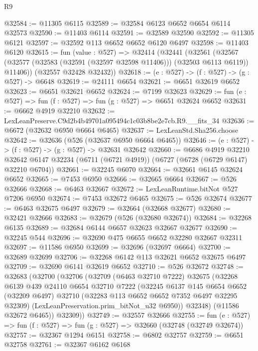 \begin{lexlean}{R9}
\begin{coremodule}
@32584 := @11305 @6115
@32589 := @32584 @6123 @6652 @6654 @6114 @32573
@32590 := @11403 @6114
@32591 := @32589 @32590
@32592 := @11305 @6121
@32597 := @32592 @113 @6652 @6652 @6120 @6497
@32598 := @11403 @6120
@32615 := fun (value : @527) =>
  @32414
    (@32441
      (@32561
        (@32567 (@32577 (@32583 (@32591 (@32597 @32598 @11406))) (@32503 @6113 @6119)) @11406))
      (@32557 @32428 @32432))
@32618 := (e : @527) -> (f : @527) -> (g : @527) -> @6648
@32619 := @24111 @6654
@32621 := @6651 @32619 @6652
@32623 := @6651 @32621 @6652
@32624 := @7199 @32623
@32629 := fun (e : @527) => fun (f : @527) => fun (g : @527) => @6651 @32624 @6652
@32631 := @6662 @4919 @32210
@32632 := LexLeanPreserve.C9d2b4b49701a095494c1c03b8be2e7cb.R9.__fits_34
@32636 := @6672 (@32632 @6950 @6664 @6465)
@32637 := LexLeanStd.Sha256.choose
@32642 := @32636 (@526 (@32637 @6950 @6664 @6465))
@32646 := (e : @527) -> (f : @527) -> (g : @527) -> @32631 @32642
@32660 := @6686
    @4919
    @32210
    @32642
    @6147
    @32234
    (@6711 (@6721 @4919))
    (@6727 (@6728 (@6729 @6147) @32210 @6704))
@32661 := @32245 @6070
@32664 := @32661 @6145 @32624 @6652
@32665 := @7453 @6950
@32666 := @32665 @6664
@32667 := @526 @32666
@32668 := @6463 @32667
@32672 := LexLeanRuntime.bitNot @527 @7206 @6950
@32674 := @7453 @32672 @6465
@32675 := @526 @32674
@32677 := @6463 @32675 @6497
@32679 := @32664 (@32668 @32677)
@32680 := @32421 @32666
@32683 := @32679 (@526 (@32680 @32674))
@32684 := @32268 @6135
@32689 := @32684 @6144 @6657 @32623 @32667 @32677
@32690 := @32245 @544
@32696 := @32690 @475 @6655 @6652 @32280 @32667 @32311
@32697 := @11586 @6950
@32699 := @32696 (@32697 @6664)
@32700 := @32689 @32699
@32706 := @32268 @6142 @113 @32621 @6652 @32675 @6497
@32709 := @32690 @6141 @32619 @6652
@32710 := @526 @32672
@32748 := @32683
    (@32700
      (@32706
        (@32709
          (@6463 @32710 @7222)
          @32675
          (@32268
            @6139
            @439
            @24110
            @6654
            @32710
            @7222
            (@32245
              @6137
              @145
              @6654
              @6652
              (@32209 @6497)
              @32710
              (@32283 @113 @6652 @6652 @7352 @6497 @32295 @32309)
              (LexLeanPreservation.prim_bitNot_u32 @6950))
            @32348)
          (@11586 @32672 @6465))
        @32309))
@32749 := @32557 @32666
@32755 := fun (e : @527) => fun (f : @527) => fun (g : @527) => @32660 (@32748 (@32749 @32674))
@32757 := @32367 @1294 @6151
@32758 := @6802 @32757
@32759 := @6651 @32758
@32761 := @32367 @6162 @6168

\end{coremodule}
\end{lexlean}
